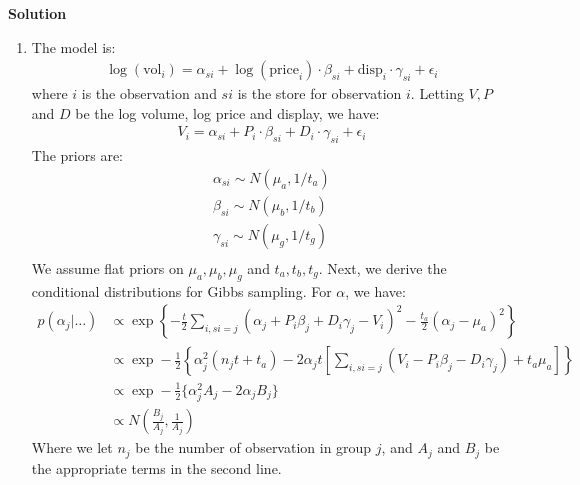 \documentclass{article}
\begin{document}
\textbf{Solution}
\begin{enumerate}
\item The model is:
\begin{align*}
\log (\mbox{vol}_i) = \alpha_{si} + \log (\mbox{price}_i) \cdot \beta_{si} + \mbox{disp}_i  \cdot \gamma_{si} + \epsilon_i 
\end{align*}
where \(i\) is the observation and \(si\) is the store for observation \(i\). Letting \(V, P\) and \(D\) be the log volume, log price and display, we have:
\begin{align*}
V_i = \alpha_{si} + P_i \cdot \beta_{si} + D_i  \cdot \gamma_{si} + \epsilon_i 
\end{align*}
The priors are:
\begin{align*}
\alpha_{si} \sim N(\mu_a, 1/t_a)\\
\beta_{si}  \sim N(\mu_b, 1/t_b)\\
\gamma_{si} \sim N(\mu_g, 1/t_g)\\
\end{align*}
We assume flat priors on \(\mu_a, \mu_b, \mu_g\) and \(t_a, t_b, t_g\).
Next, we derive the conditional distributions for Gibbs sampling. For \(\alpha\), we have:
\begin{align*}
p(\alpha_j | \ldots) &\propto \exp \left\lbrace -\frac{t}{2} \sum_{i, si = j} (\alpha_j + P_i \beta_j + D_i \gamma_j - V_i)^2 - \frac{t_a}{2} (\alpha_j - \mu_a)^2 \right\rbrace\\
&\propto \exp -\frac{1}{2}\left\lbrace \alpha_j^2(n_j t + t_a) - 2\alpha_jt \left[\sum_{i, si = j} (V_i - P_i \beta_j - D_i \gamma_j)  + t_a \mu_a\right] \right\rbrace\\
&\propto \exp -\frac{1}{2} \{ \alpha_j^2 A_j - 2 \alpha_j B_j \}\\
&\propto N\left(\frac{B_j}{A_j} , \frac{1}{A_j}\right)
\end{align*}
Where we let \(n_j\) be the number of observation in group \(j\), and \(A_j\) and \(B_j\) be the appropriate terms in the second line.


\end{enumerate}
\end{document}
